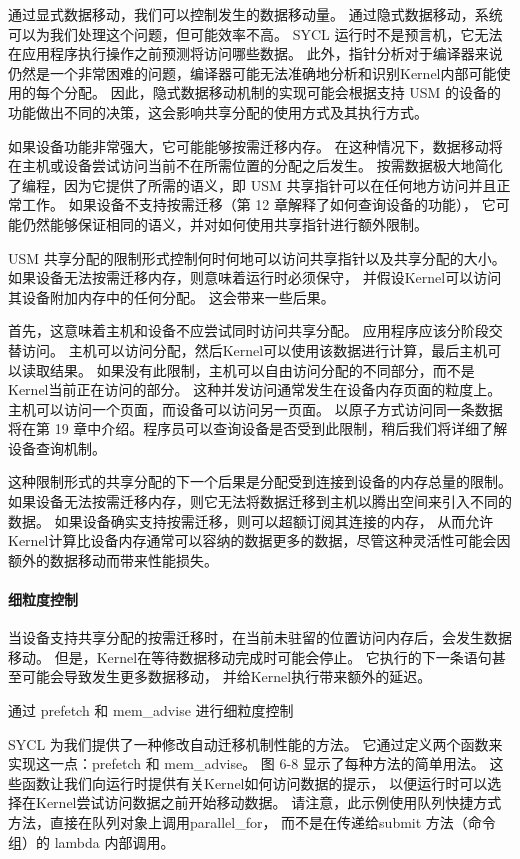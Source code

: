 通过显式数据移动，我们可以控制发生的数据移动量。 通过隐式数据移动，系统可以为我们处理这个问题，但可能效率不高。 
SYCL 运行时不是预言机，它无法在应用程序执行操作之前预测将访问哪些数据。 
此外，指针分析对于编译器来说仍然是一个非常困难的问题，编译器可能无法准确地分析和识别Kernel内部可能使用的每个分配。 
因此，隐式数据移动机制的实现可能会根据支持 USM 的设备的功能做出不同的决策，这会影响共享分配的使用方式及其执行方式。

如果设备功能非常强大，它可能能够按需迁移内存。 
在这种情况下，数据移动将在主机或设备尝试访问当前不在所需位置的分配之后发生。 
按需数据极大地简化了编程，因为它提供了所需的语义，即 USM 共享指针可以在任何地方访问并且正常工作。 
如果设备不支持按需迁移（第 12 章解释了如何查询设备的功能），
它可能仍然能够保证相同的语义，并对如何使用共享指针进行额外限制。

USM 共享分配的限制形式控制何时何地可以访问共享指针以及共享分配的大小。 
如果设备无法按需迁移内存，则意味着运行时必须保守，
并假设Kernel可以访问其设备附加内存中的任何分配。 这会带来一些后果。

首先，这意味着主机和设备不应尝试同时访问共享分配。 应用程序应该分阶段交替访问。 
主机可以访问分配，然后Kernel可以使用该数据进行计算，最后主机可以读取结果。 
如果没有此限制，主机可以自由访问分配的不同部分，而不是Kernel当前正在访问的部分。 
这种并发访问通常发生在设备内存页面的粒度上。 主机可以访问一个页面，而设备可以访问另一页面。 
以原子方式访问同一条数据将在第 19 章中介绍。程序员可以查询设备是否受到此限制，稍后我们将详细了解设备查询机制。

这种限制形式的共享分配的下一个后果是分配受到连接到设备的内存总量的限制。 
如果设备无法按需迁移内存，则它无法将数据迁移到主机以腾出空间来引入不同的数据。 
如果设备确实支持按需迁移，则可以超额订阅其连接的内存，
从而允许Kernel计算比设备内存通常可以容纳的数据更多的数据，尽管这种灵活性可能会因额外的数据移动而带来性能损失。

\paragraph{细粒度控制}

当设备支持共享分配的按需迁移时，在当前未驻留的位置访问内存后，会发生数据移动。 
但是，Kernel在等待数据移动完成时可能会停止。 它执行的下一条语句甚至可能会导致发生更多数据移动，
并给Kernel执行带来额外的延迟。

{\color{red} 通过 prefetch 和 mem\_advise 进行细粒度控制}

SYCL 为我们提供了一种修改自动迁移机制性能的方法。 它通过定义两个函数来实现这一点：prefetch 和 mem\_advise。 
图 6-8 显示了每种方法的简单用法。 这些函数让我们向运行时提供有关Kernel如何访问数据的提示，
以便运行时可以选择在Kernel尝试访问数据之前开始移动数据。 
请注意，此示例使用队列快捷方式方法，直接在队列对象上调用parallel\_for，
而不是在传递给submit 方法（命令组）的 lambda 内部调用。

